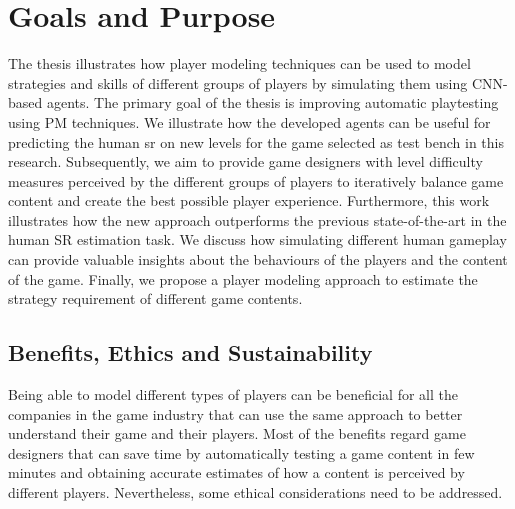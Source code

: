 \section{Goals and Purpose}
The thesis illustrates how player modeling techniques can be used to model strategies and skills of different groups of players by simulating them using \ac{CNN}-based agents. The primary goal of the thesis is improving automatic playtesting using \acl{PM} techniques. We illustrate how the developed agents can be useful for predicting the human \acs{sr} on new levels for the game selected as test bench in this research. Subsequently, we aim to provide game designers with level difficulty measures perceived by the different groups of players to iteratively balance game content and create the best possible player experience. Furthermore, this work illustrates how the new approach outperforms the previous state-of-the-art \cite{eisen_simulating_2017} in the human SR estimation task. We discuss how simulating different human gameplay can provide valuable insights about the behaviours of the players and the content of the game. Finally, we propose a player modeling approach to estimate the strategy requirement of different game contents.



\subsection{Benefits, Ethics and Sustainability}
Being able to model different types of players can be beneficial for all the companies in the game industry that can use the same approach to better understand their game and their players. Most of the benefits regard game designers that can save time by automatically testing a game content in few minutes and obtaining accurate estimates of how a content is perceived by different players. Nevertheless, some ethical considerations need to be addressed. 

